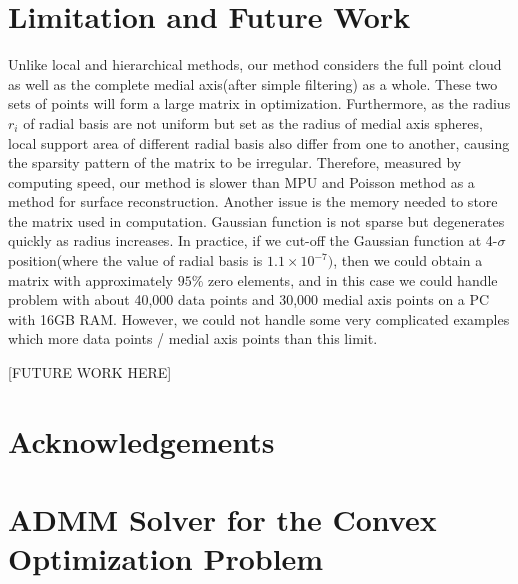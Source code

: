 \documentclass[annual]{acmsiggraph}
\begin{document}
\section{Limitation and Future Work}
Unlike local and hierarchical methods, our method considers the full point cloud as well as the complete medial axis(after simple filtering) as a whole. These two sets of points will form a large matrix in optimization. Furthermore, as the radius $r_i$ of radial basis are not uniform but set as the radius of medial axis spheres, local support area of different radial basis also differ from one to another, causing the sparsity pattern of the matrix to be irregular. Therefore, measured by computing speed, our method is slower than MPU and Poisson method as a method for surface reconstruction. Another issue is the memory needed to store the matrix used in computation. Gaussian function is not sparse but degenerates quickly as radius increases. In practice, if we cut-off the Gaussian function at 4-$\sigma$ position(where the value of radial basis is $1.1\times 10^{-7})$, then we could obtain a matrix with approximately $95\%$ zero elements, and in this case we could handle problem with about 40,000 data points and 30,000 medial axis points on a PC with 16GB RAM. However, we could not handle some very complicated examples which more data points / medial axis points than this limit. 

[FUTURE WORK HERE]

\section*{Acknowledgements}

\section{ADMM Solver for the Convex Optimization Problem}
\end{document}
